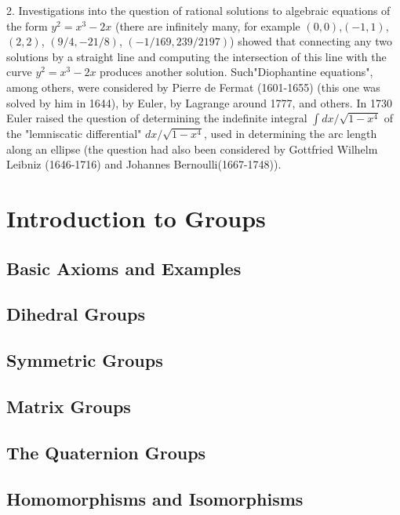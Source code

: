 \documentclass[cn,11pt,chinese]{elegantbook}
\numberwithin{equation}{section}
\begin{document}
2. Investigations into the question of rational solutions to algebraic equations of the form $y^2 = x^3 -2x$ (there are infinitely many, for example $(0, 0)$,$(-1,1)$, $(2,2)$, $(9/4, -21/8)$, $(-1/169, 239/2197)$) showed that connecting any two solutions by a straight line and computing the intersection of this line with the curve $y^2 = x^3 -2x$ produces another solution. Such"Diophantine equations", among others, were considered by Pierre de Fermat (1601-1655) (this one was solved by him in 1644), by Euler, by Lagrange around 1777, and others. In 1730 Euler raised the question of determining the indefinite integral $\int{dx/\sqrt{1-x^4}}$ of the "lemniscatic differential" $dx/\sqrt{1-x^4}$, used in determining the arc length along an ellipse (the question had also been considered by Gottfried Wilhelm Leibniz (1646-1716) and Johannes Bernoulli(1667-1748)).



\chapter{Introduction to Groups}\label{chapter001}
\section{Basic Axioms and Examples}\label{section00101}


\section{Dihedral Groups}\label{section00102}



\section{Symmetric Groups}\label{section00103}



\section{Matrix Groups}\label{section00104}



\section{The Quaternion Groups}\label{section00105}



\section{Homomorphisms and Isomorphisms}\label{section00106}
\end{document}

